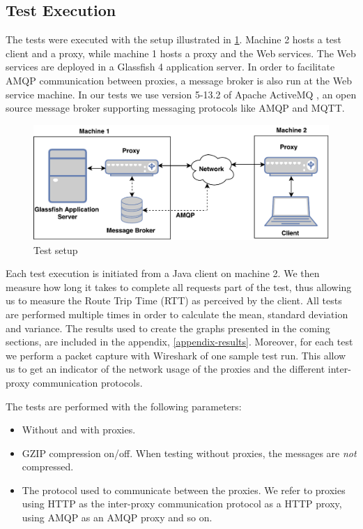 \subsection{Test Execution}

The tests were executed with the setup illustrated in
\cref{figure-testing-setup}. Machine 2 hosts a test client and a proxy, while
machine 1 hosts a proxy and the Web services. The Web services are deployed in a
Glassfish 4 application server. In order to facilitate AMQP communication
between proxies, a message broker is also run at the Web service machine. In our
tests we use version 5-13.2 of Apache ActiveMQ \cite{activemq-homepage}, an
open source message broker supporting messaging protocols like AMQP and MQTT.

\begin{figure}[h]
\includegraphics[width=\textwidth]{images/testing_setup.pdf}
\caption{Test setup}
\label{figure-testing-setup}
\end{figure}

Each test execution is initiated from a Java client on machine 2. We then
measure how long it takes to complete all requests part of the test, thus
allowing us to measure the Route Trip Time (RTT) as perceived by the client. All
tests are performed multiple times in order to calculate the mean, standard
deviation and variance. The results used to create the graphs presented in the
coming sections, are included in the appendix, \cref{appendix-results}.
Moreover, for each test we perform a packet capture with Wireshark of one sample
test run. This allow us to get an indicator of the network usage of the proxies
and the different inter-proxy communication protocols.

The tests are performed
with the following parameters:

\begin{itemize}

    \item Without and with proxies.

    \item GZIP compression on/off. When testing without proxies, the messages
    are \textit{not} compressed.

    \item The protocol used to communicate between the proxies. We refer to
    proxies using HTTP as the inter-proxy communication protocol as a HTTP
    proxy, using AMQP as an AMQP proxy and so on.

\end{itemize}




